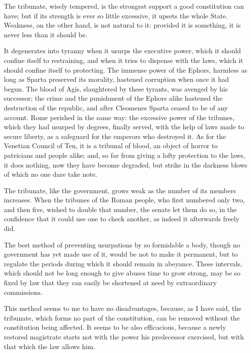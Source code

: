 \documentclass[12pt]{report}
\begin{document}
The tribunate, wisely tempered, is the strongest support a good constitution can have; but if its strength is ever so little excessive, it upsets the whole State. Weakness, on the other hand, is not natural to it: provided it is something, it is never less than it should be.

It degenerates into tyranny when it usurps the executive power, which it should confine itself to restraining, and when it tries to dispense with the laws, which it should confine itself to protecting. The immense power of the Ephors, harmless as long as Sparta preserved its morality, hastened corruption when once it had begun. The blood of Agis, slaughtered by these tyrants, was avenged by his successor; the crime and the punishment of the Ephors alike hastened the destruction of the republic, and after Cleomenes Sparta ceased to be of any account. Rome perished in the same way: the excessive power of the tribunes, which they had usurped by degrees, finally served, with the help of laws made to secure liberty, as a safeguard for the emperors who destroyed it. As for the Venetian Council of Ten, it is a tribunal of blood, an object of horror to patricians and people alike; and, so far from giving a lofty protection to the laws, it does nothing, now they have become degraded, but strike in the darkness blows of which no one dare take note.

The tribunate, like the government, grows weak as the number of its members increases. When the tribunes of the Roman people, who first numbered only two, and then five, wished to double that number, the senate let them do so, in the confidence that it could use one to check another, as indeed it afterwards freely did.

The best method of preventing usurpations by so formidable a body, though no government has yet made use of it, would be not to make it permanent, but to regulate the periods during which it should remain in abeyance. These intervals, which should not be long enough to give abuses time to grow strong, may be so fixed by law that they can easily be shortened at need by extraordinary commissions.

This method seems to me to have no disadvantages, because, as I have said, the tribunate, which forms no part of the constitution, can be removed without the constitution being affected. It seems to be also efficacious, because a newly restored magistrate starts not with the power his predecessor exercised, but with that which the law allows him.
\end{document}
